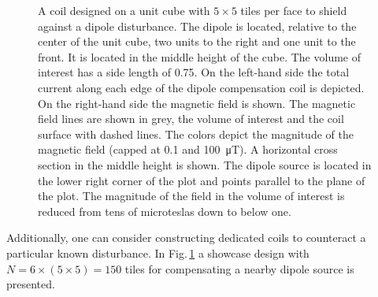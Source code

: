 \begin{figure}
  \centering
  \caption{A coil designed on a unit cube with $5 \times 5$ tiles per face to shield against a dipole disturbance. The dipole is located, relative to the center of the unit cube, two units to the right and one unit to the front. It is located in the middle height of the cube. The volume of interest has a side length of \num{0.75}. On the left-hand side the total current along each edge of the dipole compensation coil is depicted. On the right-hand side the magnetic field is shown. The magnetic field lines are shown in grey, the volume of interest and the coil surface with dashed lines. The colors depict the magnitude of the magnetic field (capped at \num{0.1} and \SI{100}{\micro\tesla}). A horizontal cross section in the middle height is shown. The dipole source is located in the lower right corner of the plot and points parallel to the plane of the plot. The magnitude of the field in the volume of interest is reduced from tens of microteslas down to below one.}\label{fig:showcase}
\end{figure}

Additionally, one can consider constructing dedicated coils to counteract a particular known disturbance.
In Fig.\,\ref{fig:showcase} a showcase design with $N = 6 \times (5 \times 5) = 150$ tiles for compensating a nearby dipole source is presented.

